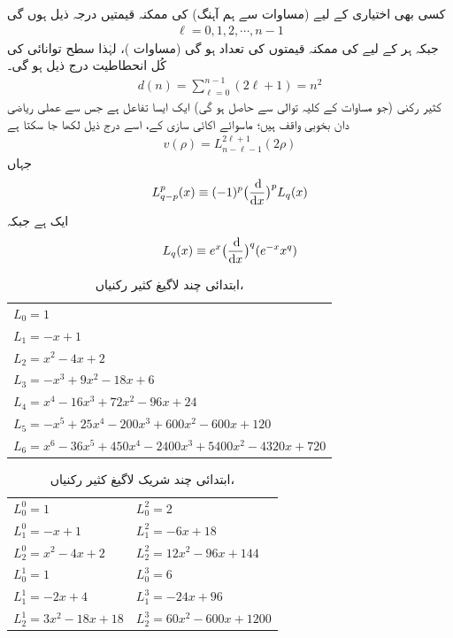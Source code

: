  کسی بھی اختیاری  کے لیے (مساوات  سے ہم آہنگ)  کی ممکنہ قیمتیں درجہ ذیل ہوں گی
\begin{align}
\ell=0,1,2,\cdots, n-1 
\end{align}
جبکہ ہر  کے لیے  کی ممکنہ قیمتوں کی تعداد  ہو گی (مساوات )، لہٰذا  سطح توانائی کی کُل انحطاطیت درج ذیل ہو گی۔ 
\begin{align}
d(n)=\sum_{\ell=0}^{n-1}(2\ell+1)=n^{2} 
\end{align}
کثیر رکنی  (جو مساوات  کے کلیہ توالی سے حاصل ہو گی) ایک ایسا تفاعل ہے جس سے عملی ریاضی دان بخوبی واقف ہیں؛ ماسوائے اکائی سازی کے، اسے درج ذیل لکھا جا سکتا ہے
 \begin{align}\label{مساوات_تین_ابعادی_لاگیغ_الف}
v(\rho)=L_{n-\ell-1}^{2\ell+1}(2\rho) 
\end{align}
 جہاں
 \begin{align}\label{مساوات_تین_ابعادی_لاگیغ_ب}
L_{q-p}^{p}(x)\equiv(-1)^{p}\big(\frac{\dif}{\dif{x}}\big)^{p}L_{q}(x) 
\end{align} 
 ایک  ہے جبکہ 
\begin{align}\label{مساوات_تین_ابعادی_لاگیغ_پ}
 L_{q}(x)\equiv e^{x}\big(\frac{\dif}{\dif{x}}\big)^{q}(e^{-x}x^{q}) 
\end{align}
\begin{table}
\caption{ابتدائی چند لاگیغ کثیر رکنیاں، }
\label{جدول_ابعاد_لاگیغ_ابتدائی_چند}
\centering
\renewcommand{\arraystretch}{1.25}
\begin{tabular}{l}
\toprule
$L_0=1$\\
$L_1=-x+1$\\
$L_2=x^2-4x+2$\\
$L_3=-x^3+9x^2-18x+6$\\
$L_4=x^4-16x^3+72x^2-96x+24$\\
$L_5=-x^5+25x^4-200x^3+600x^2-600x+120$\\
$L_6=x^6-36x^5+450x^4-2400x^3+5400x^2-4320x+720$\\
\bottomrule
\end{tabular}
\end{table}
\begin{table}
\caption{ابتدائی چند شریک لاگیغ کثیر رکنیاں، }
\label{جدول_ابعادی_شریک_لاگیغ_کثیر_رکنیاں}
\centering
\renewcommand{\arraystretch}{1.25}
\begin{tabular}{ll}
\toprule
$L_0^0=1$ & $L_0^2=2$\\
$L_1^0=-x+1$ & $L_1^2=-6x+18$\\
$L_2^0=x^2-4x+2$ & $L_2^2=12x^2-96x+144$\\
$L_0^1=1$ & $L_0^3=6$\\
$L_1^1=-2x+4$ & $L_1^3=-24x+96$\\
$L_2^1=3x^2-18x+18$ & $L_2^3=60x^2-600x+1200$\\
\bottomrule
\end{tabular}
\end{table}

